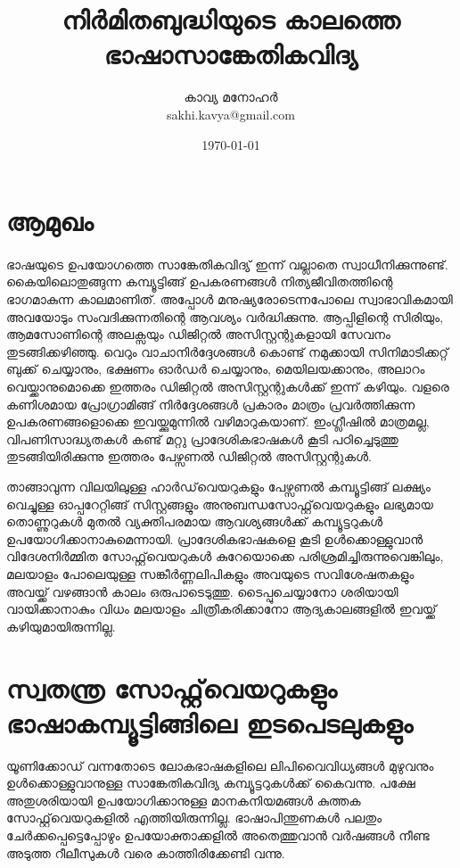 \documentclass[12pt,twoside,a4paper]{article}
\title{\textbf{നിർമിതബുദ്ധിയുടെ കാലത്തെ ഭാഷാസാങ്കേതികവിദ്യ}}
\author{കാവ്യ മനോഹർ \\ sakhi.kavya@gmail.com}
\date{\today}
\begin{document}
\maketitle
{}


\section{ആമുഖം}
\paragraph{}
ഭാഷയുടെ ഉപയോഗത്തെ സാങ്കേതികവിദ്യ് ഇന്ന് വല്ലാതെ സ്വാധീനിക്കുന്നുണ്ട്. കൈയിലൊതുങ്ങുന്ന കമ്പ്യൂട്ടിങ്ങ് ഉപകരണങ്ങൾ നിത്യജീവിതത്തിന്റെ ഭാഗമാകുന്ന കാലമാണിത്. അപ്പോൾ മനുഷ്യരോടെന്നപോലെ സ്വാഭാവികമായി അവയോടും സംവദിക്കുന്നതിന്റെ ആവശ്യം വർദ്ധിക്കുന്നു. ആപ്പിളിന്റെ സിരിയും, ആമസോണിന്റെ അലക്സയും ഡിജിറ്റൽ അസിസ്റ്റന്റുകളായി സേവനം തുടങ്ങിക്കഴിഞ്ഞു. വെറും വാചാനിർദ്ദേശങ്ങൾ കൊണ്ട് നമുക്കായി സിനിമാടിക്കറ്റ് ബുക്ക് ചെയ്യാനും, ഭക്ഷണം ഓർഡർ ചെയ്യാനും, മെയിലയക്കാനും, അലാറം വെയ്ക്കാനുമൊക്കെ ഇത്തരം ഡിജിറ്റൽ അസിസ്റ്റന്റുകൾക്ക് ഇന്ന് കഴിയും. വളരെ കണിശമായ പ്രോഗ്രാമിങ്ങ് നിർദ്ദേശങ്ങൾ പ്രകാരം മാത്രം പ്രവർത്തിക്കുന്ന ഉപകരണങ്ങളൊക്കെ ഇവയ്ക്കുമുന്നിൽ വഴിമാറുകയാണ്.  ഇംഗ്ലീഷിൽ മാത്രമല്ല, വിപണിസാദ്ധ്യതകൾ കണ്ട് മറ്റു പ്രാദേശികഭാഷകൾ കൂടി പഠിച്ചെടുത്തു തുടങ്ങിയിരിക്കുന്നു ഇത്തരം പേഴ്സണൽ ഡിജിറ്റൽ അസിസ്റ്റന്റുകൾ.

താങ്ങാവുന്ന വിലയിലുള്ള ഹാർഡ്‌വെയറുകളും പേഴ്സണൽ കമ്പ്യൂട്ടിങ്ങ് ലക്ഷ്യം വെച്ചുള്ള ഓപ്പറേറ്റിങ്ങ് സിസ്റ്റങ്ങളും അനുബന്ധസോഫ്റ്റ്‌വെയറുകളും ലഭ്യമായ തൊണ്ണുറുകൾ മുതൽ വ്യക്തിപരമായ ആവശ്യങ്ങൾക്ക്  കമ്പ്യൂട്ടറുകൾ ഉപയോഗിക്കാനാകുമെന്നായി. പ്രാദേശികഭാഷകളെ കൂടി ഉൾക്കൊള്ളുവാൻ  വിദേശനിർമ്മിത സോഫ്റ്റ്‌വെയറുകൾ കുറേയൊക്കെ പരിശ്രമിച്ചിരുന്നുവെങ്കിലും, മലയാളം പോലെയുള്ള സങ്കീർണ്ണലിപികളും അവയുടെ സവിശേഷതകളും അവയ്ക്ക് വഴങ്ങാൻ കാലം ഒരുപാടെടുത്തു. ടൈപ്പുചെയ്യാനോ ശരിയായി വായിക്കാനാകും വിധം മലയാളം ചിത്രീകരിക്കാനോ ആദ്യകാലങ്ങളിൽ ഇവയ്ക്ക് കഴിയുമായിരുന്നില്ല. 




\section{സ്വതന്ത്ര സോഫ്റ്റ്‌വെയറുകളും ഭാഷാകമ്പ്യൂട്ടിങ്ങിലെ ഇടപെടലുകളും}

യൂണിക്കോഡ് വന്നതോടെ ലോകഭാഷകളിലെ ലിപിവൈവിധ്യങ്ങൾ മുഴുവനും ഉൾക്കൊള്ളുവാനുള്ള സാങ്കേതികവിദ്യ കമ്പ്യൂട്ടറുകൾക്ക് കൈവന്നു. പക്ഷേ അതുശരിയായി ഉപയോഗിക്കാനുള്ള  മാനകനിയമങ്ങൾ കുത്തക സോഫ്റ്റ്‌വെയറുകളിൽ എത്തിയിരുന്നില്ല. ഭാഷാപിന്തുണകൾ പലതും ചേർക്കപ്പെട്ടെപ്പോഴും  ഉപയോക്താക്കളിൽ അതെത്തുവാൻ വർഷങ്ങൾ നീണ്ട അടുത്ത റീലീസുകൾ വരെ കാത്തിരിക്കേണ്ടി വന്നു. 
\end{document}
